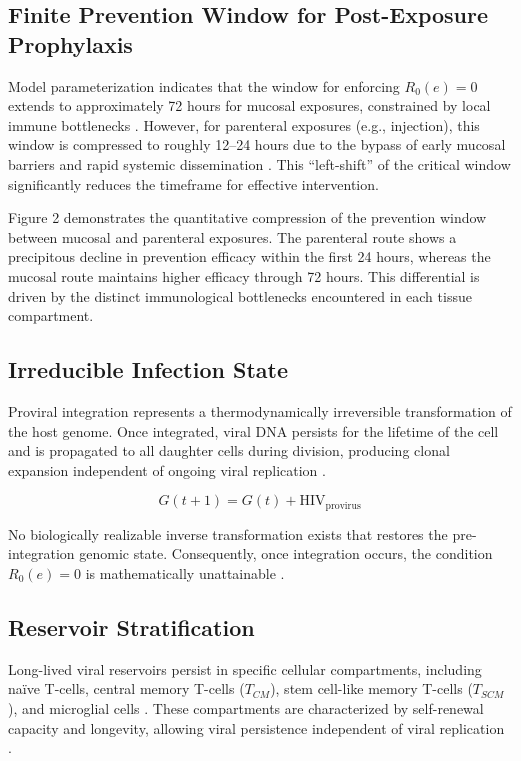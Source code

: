\documentclass[12pt]{article}
\begin{document}
\subsection{Finite Prevention Window for Post-Exposure Prophylaxis}

Model parameterization indicates that the window for enforcing $R_0(e)=0$ extends to approximately 72 hours for mucosal exposures, constrained by local immune bottlenecks \cite{tanner_npep_2025}. However, for parenteral exposures (e.g., injection), this window is compressed to roughly 12--24 hours due to the bypass of early mucosal barriers and rapid systemic dissemination \cite{strathdee_preventing_2020}. This ``left-shift'' of the critical window significantly reduces the timeframe for effective intervention.

Figure 2 demonstrates the quantitative compression of the prevention window between mucosal and parenteral exposures. The parenteral route shows a precipitous decline in prevention efficacy within the first 24 hours, whereas the mucosal route maintains higher efficacy through 72 hours. This differential is driven by the distinct immunological bottlenecks encountered in each tissue compartment.

\subsection{Irreducible Infection State}

Proviral integration represents a thermodynamically irreversible transformation of the host genome. Once integrated, viral DNA persists for the lifetime of the cell and is propagated to all daughter cells during division, producing clonal expansion independent of ongoing viral replication \cite{wahl_hiv_2023}.

\begin{equation}
G(t+1) = G(t) + \text{HIV}_{\text{provirus}}
\end{equation}

No biologically realizable inverse transformation exists that restores the pre-integration genomic state. Consequently, once integration occurs, the condition $R_0(e)=0$ is mathematically unattainable \cite{brown_long-term_2019, hutter_long-term_2009}.

\subsection{Reservoir Stratification}

Long-lived viral reservoirs persist in specific cellular compartments, including naïve T-cells, central memory T-cells ($T_{CM}$), stem cell-like memory T-cells ($T_{SCM}$), and microglial cells \cite{wahl_hiv_2023, anderson_neuroinflammation_2020}. These compartments are characterized by self-renewal capacity and longevity, allowing viral persistence independent of viral replication \cite{hellmuth_very_2018}.
\end{document}
